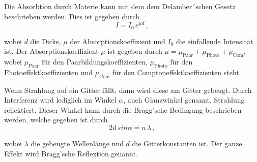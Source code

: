 \noindent
Die Absorbtion durch Materie kann mit dem dem Delamber´schen Gesetz beschrieben werden. Dies ist gegeben durch 
\begin{equation}
    I = I_0 \, e^{\mu d} \, ,
    \label{eqn:Delamber}
\end{equation}

\noindent
wobei $d$ die Dicke, $\mu$ der Absorptionskoeffizient und $I_0$ die einfallende Intensität ist. Der Absorptionskoeffizient $\mu$ ist gegeben durch 
$\mu = \mu_\text{Paar} + \mu_\text{Photo} + \mu_\text{Com}$, wobei $\mu_\text{Paar}$ für den Paarbildungskoeffizienten, $\mu_\text{Photo}$  für den Photoeffektkoeffizienten und
$\mu_\text{Com}$ für den Comptoneffektkoeffizienten steht.

\noindent
Wenn Strahlung auf ein Gitter fällt, dann wird diese am Gitter gebeugt. Durch Interferenz wird lediglich im Winkel $\alpha$, auch Glanzwinkel genannt, Strahlung reflektiert.
Dieser Winkel kann durch die Bragg'sche Bedingung beschrieben werden, welche gegeben ist durch
\begin{equation}
    2 d \, sin \alpha = n \, \lambda \, ,
    \label{eqn:Bragg}
\end{equation}

\noindent
wobei $\lambda$ die gebeugte Wellenlänge und $d$ die Gitterkonstanten ist. Der ganze Effekt wird Bragg'sche Reflextion genannt.
